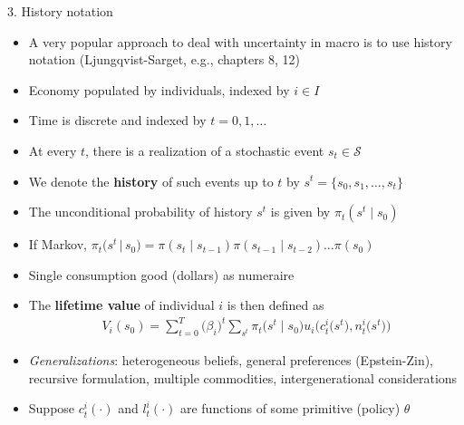 \documentclass[10pt]{beamer}
\begin{document}
\begin{frame}{3. History notation}
\begin{itemize}
\item A very popular approach to deal with uncertainty in macro is to use history notation (Ljungqvist-Sarget, e.g., chapters 8, 12)

\item Economy populated by individuals, indexed by $i \in I$

\item Time is discrete and indexed by $t = 0, 1, \ldots$

\item At every $t$, there is a realization of a stochastic event $s_t \in \mathcal S$

\item We denote the \textbf{history} of such events up to $t$ by $s^t = \{s_0, s_1, \ldots, s_t\}$

\item The unconditional probability of history $s^t$ is given by $\pi_t(s^t \mid s_0)$

\item If Markov, $\pi_t \Big( s^t \, | \, s_0 \Big) = \pi(s_t \mid s_{t-1}) \pi(s_{t-1} \mid s_{t-2}) \ldots \pi(s_0)$

\item Single consumption good (dollars) as numeraire
\end{itemize}
\end{frame}



\begin{frame}{}
\begin{itemize}
\item The \textbf{lifetime value} of individual $i$ is then defined as 
\begin{align*}
	V_i(s_0) = \sum_{t=0}^T \Big( \beta_i \Big)^t \sum_{s^t} \pi_t \Big( s^t \mid s_0 \Big) u_i \Big( c_t^i \Big( s^t \Big), n_t^i \Big(s^t \Big) \Big)
\end{align*}

\item \textit{Generalizations}: heterogeneous beliefs, general preferences (Epstein-Zin), recursive formulation, multiple commodities, intergenerational considerations

\item Suppose $c_t^i(\cdot)$ and $l_t^i(\cdot)$ are functions of some primitive (policy) $\theta$

\end{itemize}
\end{frame}
\end{document}
